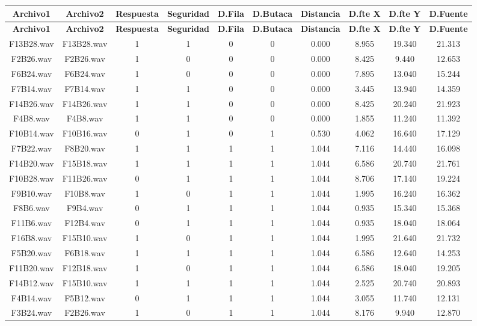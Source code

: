 \documentclass[11pt,a4paper]{book}
\begin{document}
    \begin{longtable}[c]{|c|c|c|c|c|c|c|c|c|c|}

		\hline
		\textbf{Archivo1}&\textbf{Archivo2}&\textbf{Respuesta}&\textbf{Seguridad}&\textbf{D.Fila}&\textbf{D.Butaca}&\textbf{Distancia}&\textbf{D.fte X}&\textbf{D.fte Y}&\textbf{D.Fuente}\\ \hline
		\endfirsthead
		\hline
		\textbf{Archivo1}&\textbf{Archivo2}&\textbf{Respuesta}&\textbf{Seguridad}&\textbf{D.Fila}&\textbf{D.Butaca}&\textbf{Distancia}&\textbf{D.fte X}&\textbf{D.fte Y}&\textbf{D.Fuente}\\ \hline
		\endhead
		
		F13B28.wav&F13B28.wav&1&1&0&0&0.000&8.955&19.340&21.313\\ \hline
F2B26.wav&F2B26.wav&1&0&0&0&0.000&8.425&9.440&12.653\\ \hline
F6B24.wav&F6B24.wav&1&0&0&0&0.000&7.895&13.040&15.244\\ \hline
F7B14.wav&F7B14.wav&1&1&0&0&0.000&3.445&13.940&14.359\\ \hline
F14B26.wav&F14B26.wav&1&1&0&0&0.000&8.425&20.240&21.923\\ \hline
F4B8.wav&F4B8.wav&1&1&0&0&0.000&1.855&11.240&11.392\\ \hline
F10B14.wav&F10B16.wav&0&1&0&1&0.530&4.062&16.640&17.129\\ \hline
F7B22.wav&F8B20.wav&1&1&1&1&1.044&7.116&14.440&16.098\\ \hline
F14B20.wav&F15B18.wav&1&1&1&1&1.044&6.586&20.740&21.761\\ \hline
F10B28.wav&F11B26.wav&0&1&1&1&1.044&8.706&17.140&19.224\\ \hline
F9B10.wav&F10B8.wav&1&0&1&1&1.044&1.995&16.240&16.362\\ \hline
F8B6.wav&F9B4.wav&0&1&1&1&1.044&0.935&15.340&15.368\\ \hline
F11B6.wav&F12B4.wav&0&1&1&1&1.044&0.935&18.040&18.064\\ \hline
F16B8.wav&F15B10.wav&1&0&1&1&1.044&1.995&21.640&21.732\\ \hline
F5B20.wav&F6B18.wav&1&1&1&1&1.044&6.586&12.640&14.253\\ \hline
F11B20.wav&F12B18.wav&1&0&1&1&1.044&6.586&18.040&19.205\\ \hline
F14B12.wav&F15B10.wav&1&1&1&1&1.044&2.525&20.740&20.893\\ \hline
F4B14.wav&F5B12.wav&0&1&1&1&1.044&3.055&11.740&12.131\\ \hline
F3B24.wav&F2B26.wav&1&0&1&1&1.044&8.176&9.940&12.870\\ \hline

\end{longtable}
\end{document}
